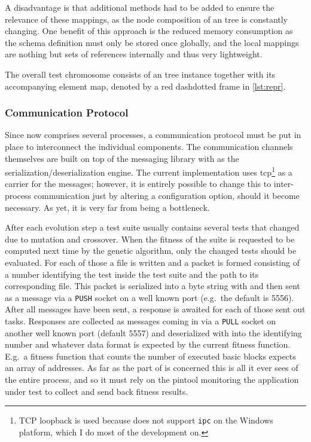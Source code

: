 \newpage
A disadvantage is that
additional methods had to be added to ensure the relevance of these mappings, as the node composition of an
\xml tree is constantly changing. 
One benefit of this approach is the reduced memory consumption as the schema
definition must only be stored once globally, and the local mappings are nothing but sets of references 
internally and thus very lightweight. 

The overall \xml test chromosome consists of an \xml tree instance together with its accompanying element map,
denoted by a red dashdotted frame in \cref{lst:repr}.

\subsubsection{Communication Protocol}
\label{sec:proto}
Since \xmlmate now comprises several processes, a communication protocol must be put in place to 
interconnect the individual components. The communication channels themselves are built on top of
the \zmq messaging library with \msgpack as the serialization/deserialization engine. The current
implementation uses tcp\footnote{TCP loopback is used because \zmq does not support \texttt{ipc} on the
Windows platform, which I do most of the development on.} as a carrier for the messages; however, it is
entirely possible to change this to inter-process communication just by altering a configuration option,
should it become necessary. As yet, it is very far from being a bottleneck.

After each evolution step a test suite usually contains several tests that changed due to mutation and
crossover. When the fitness of the suite is requested to be computed next time by the genetic algorithm, 
only the changed tests should be evaluated. For each of those a file is written and a packet is 
formed consisting of a number identifying the test inside the test suite and the path to its corresponding 
file. This packet is serialized into a byte string with \msgpack and then sent as a \zmq message via a 
\texttt{PUSH} socket on a well known port (e.g.\ the default is 5556). After all messages have been sent,
a response is awaited for each of those sent out tasks. Responses are collected as \zmq messages coming 
in via a \texttt{PULL} socket on another well known port (default 5557) and deserialized with \msgpack 
into the identifying number and whatever data format is expected by the current fitness function. 
E.g.\ a fitness function that counts the number of executed basic blocks expects an array of addresses.
As far as the \java part of \xmlmate is concerned this is all it ever sees of the entire process, and so it 
must rely on the pintool monitoring the application under test to collect and send back fitness results.

